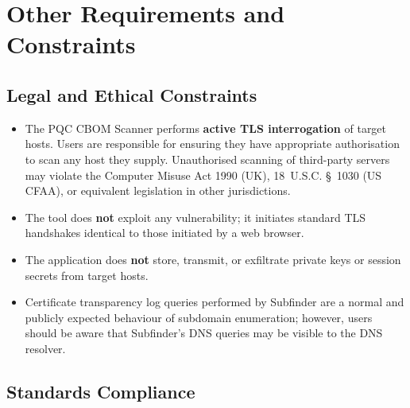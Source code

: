 \chapter{Other Requirements and Constraints}
\label{chap:constraints}

\section{Legal and Ethical Constraints}
\label{sec:legal}

\begin{itemize}[noitemsep]
  \item The PQC CBOM Scanner performs \textbf{active TLS interrogation} of target
        hosts. Users are responsible for ensuring they have appropriate authorisation
        to scan any host they supply. Unauthorised scanning of third-party servers
        may violate the Computer Misuse Act 1990 (UK), 18~U.S.C. §~1030 (US CFAA),
        or equivalent legislation in other jurisdictions.
  \item The tool does \textbf{not} exploit any vulnerability; it initiates standard
        TLS handshakes identical to those initiated by a web browser.
  \item The application does \textbf{not} store, transmit, or exfiltrate private
        keys or session secrets from target hosts.
  \item Certificate transparency log queries performed by Subfinder are a normal
        and publicly expected behaviour of subdomain enumeration; however, users
        should be aware that Subfinder's DNS queries may be visible to the DNS
        resolver.
\end{itemize}

\section{Standards Compliance}
\label{sec:standards}

